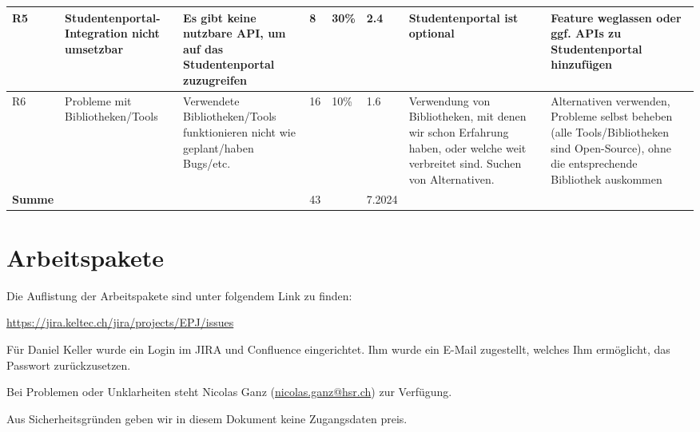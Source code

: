 \documentclass[a4paper]{article}
\let\oldsection\section
\renewcommand\section{\clearpage\oldsection}
\def\jiraurl{https://jira.keltec.ch/jira}
\begin{document}
\begin{landscape}
\begin{tabulary}{\linewidth}{lLLlLLLL}
    R5 & 
    Studenten\-portal-Integration nicht umsetzbar & 
    Es gibt keine nutzbare API, um auf das Studentenportal zuzugreifen & 
    8 & 
    30\% & 
    2.4 & 
    Studentenportal ist optional & 
    Feature weglassen oder ggf. APIs zu Studentenportal hinzufügen \\  \hline

    R6 &
    Probleme mit Bibliotheken/Tools &
    Verwendete Bibliotheken/Tools funktionieren nicht wie geplant/haben Bugs/etc. &
    16 &
    10\% &
    1.6 &
    Verwendung von Bibliotheken, mit denen wir schon Erfahrung haben, oder welche weit verbreitet sind. Suchen von Alternativen. &
    Alternativen verwenden, Probleme selbst beheben (alle Tools/Bibliotheken sind Open-Source), ohne die entsprechende Bibliothek auskommen \\ \midrule

    \textbf{Summe} & & & 43 & & 7.2024 & & \\
    \bottomrule
  \end{tabulary}
\end{landscape}
\restoregeometry

\section{Arbeitspakete}

Die Auflistung der Arbeitspakete sind unter folgendem Link zu finden:

\url{\jiraurl/projects/EPJ/issues}

Für Daniel Keller wurde ein Login im JIRA und Confluence eingerichtet.
Ihm wurde ein E-Mail zugestellt, welches Ihm ermöglicht, das Passwort zurückzusetzen.

Bei Problemen oder Unklarheiten steht Nicolas Ganz (\url{nicolas.ganz@hsr.ch}) zur Verfügung.

Aus Sicherheitsgründen geben wir in diesem Dokument keine Zugangsdaten preis.
\end{document}
